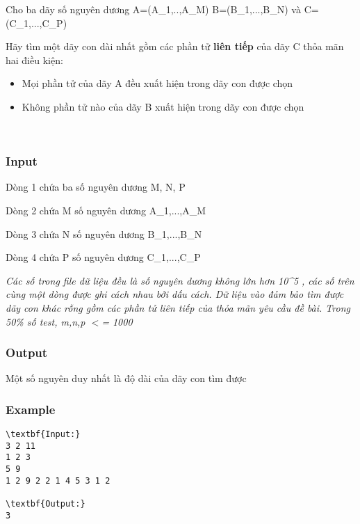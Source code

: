 

Cho ba dãy số nguyên dương A=(A\_1,..,A\_M) B=(B\_1,...,B\_N) và C=(C\_1,...,C\_P)

Hãy tìm một dãy con dài nhất gồm các phần tử \textbf{ liên tiếp } của dãy C thỏa mãn hai điều kiện:
\begin{itemize}
	\item Mọi phần tử của dãy A đều xuất hiện trong dãy con được chọn
	\item Không phần tử nào của dãy B xuất hiện trong dãy con được chọn
\end{itemize}

 

\subsubsection{Input}

Dòng 1 chứa ba số nguyên dương M, N, P

Dòng 2 chứa M số nguyên dương A\_1,...,A\_M

Dòng 3 chứa N số nguyên dương B\_1,...,B\_N

Dòng 4 chứa P số nguyên dương C\_1,...,C\_P

\emph{Các số trong file dữ liệu đều là số nguyên dương không lớn hơn 10\textasciicircum5 }\emph{ , các số trên cùng một dòng được ghi cách nhau bởi dấu cách. Dữ liệu vào đảm bảo tìm được dãy con khác rỗng gồm các phần tử liên tiếp của }\emph{ thỏa mãn yêu cầu đề bài. Trong 50\% số test, m,n,p $<$= 1000 }

\subsubsection{Output}

Một số nguyên duy nhất là độ dài của dãy con tìm được

\subsubsection{Example}
\begin{verbatim}
\textbf{Input:}
3 2 11
1 2 3
5 9
1 2 9 2 2 1 4 5 3 1 2

\textbf{Output:}
3\end{verbatim}